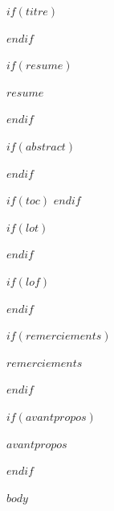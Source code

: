 \documentclass[12pt]{ulaval}
\date{$date$}
\begin{document}
$if(titre)$
  \maketitle
$endif$

\frontmatter %
\pagestyle{plain} %
\setcounter{page}{2}

$if(resume)$
  \begin{resume}
    $resume$
  \end{resume}
$endif$

$if(abstract)$
  \begin{abstract}
    $abstract$
  \end{abstract}
$endif$


$if(toc)$
  \hypersetup{linkcolor=$if(toccolor)$$toccolor$$else$black$endif$}
   \setcounter{tocdepth}{$toc-depth$}
  \tableofcontents
$endif$

$if(lot)$
  \listoftables
$endif$

$if(lof)$
  \listoffigures
$endif$

$if(remerciements)$
  \begin{remerciements}
    $remerciements$
  \end{remerciements}
$endif$

$if(avantpropos)$
  \begin{avantpropos}
    $avantpropos$
  \end{avantpropos}
$endif$


\mainmatter %
\pagestyle{fancyplain} %

$body$


\end{document}

